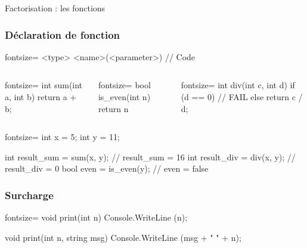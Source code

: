 \begin{frame}
  \begin{center}
    \vspace{1cm}
    {\Large Factorisation : les fonctions}
  \end{center}
\end{frame}

\begin{frame}[fragile]
  \frametitle{Déclaration de fonction}

  \begin{csharpcode*}{fontsize=\normalsize}
    <type> <name>(<parameter>)
    {
      // Code
    }
  \end{csharpcode*}
\end{frame}

\begin{frame}[fragile]
  \begin{columns}[c]
    \column{2.3in}
    \begin{csharpcode*}{fontsize=\normalsize}
      int sum(int a, int b)
      {
        return a + b;
      }
    \end{csharpcode*}

    \pause

    \begin{csharpcode*}{fontsize=\normalsize}
      bool is_even(int n)
      {
        return n %
      }
    \end{csharpcode*}

    \pause

    \column{2.3in}
    \begin{csharpcode*}{fontsize=\normalsize}
      int div(int c, int d)
      {
        if (d == 0)
        {
          // FAIL
        }
        else
          return c / d;
      }
    \end{csharpcode*}
  \end{columns}
\end{frame}

\begin{frame}[fragile]
  \begin{csharpcode*}{fontsize=\normalsize}
    int x = 5;
    int y = 11;

    int result_sum = sum(x, y); // result_sum = 16
    int result_div = div(x, y); // result_div = 0
    bool even = is_even(y); // even = false
  \end{csharpcode*}
\end{frame}

\begin{frame}[fragile]
  \frametitle{Surcharge}

  \begin{csharpcode*}{fontsize=\normalsize}
    void print(int n)
    {
      Console.WriteLine (n);
    }

    void print(int n, string msg)
    {
      Console.WriteLine (msg + " " + n);
    }
  \end{csharpcode*}
\end{frame}

